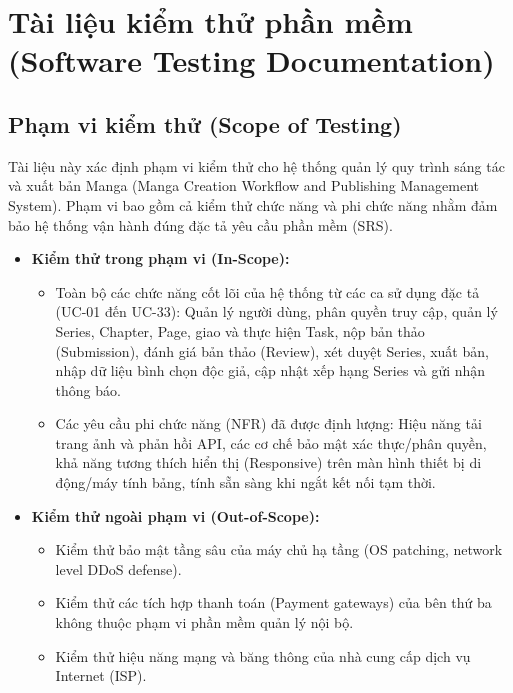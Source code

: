 \chapter{Tài liệu kiểm thử phần mềm (Software Testing Documentation)}
\label{ch:kiem_thu}

\section{Phạm vi kiểm thử (Scope of Testing)}
\label{sec:test_scope}

Tài liệu này xác định phạm vi kiểm thử cho hệ thống quản lý quy trình sáng tác và xuất bản Manga (Manga Creation Workflow and Publishing Management System). Phạm vi bao gồm cả kiểm thử chức năng và phi chức năng nhằm đảm bảo hệ thống vận hành đúng đặc tả yêu cầu phần mềm (SRS).

\begin{itemize}
    \item \textbf{Kiểm thử trong phạm vi (In-Scope):}
    \begin{itemize}
        \item Toàn bộ các chức năng cốt lõi của hệ thống từ các ca sử dụng đặc tả (UC-01 đến UC-33): Quản lý người dùng, phân quyền truy cập, quản lý Series, Chapter, Page, giao và thực hiện Task, nộp bản thảo (Submission), đánh giá bản thảo (Review), xét duyệt Series, xuất bản, nhập dữ liệu bình chọn độc giả, cập nhật xếp hạng Series và gửi nhận thông báo.
        \item Các yêu cầu phi chức năng (NFR) đã được định lượng: Hiệu năng tải trang ảnh và phản hồi API, các cơ chế bảo mật xác thực/phân quyền, khả năng tương thích hiển thị (Responsive) trên màn hình thiết bị di động/máy tính bảng, tính sẵn sàng khi ngắt kết nối tạm thời.
    \end{itemize}
    \item \textbf{Kiểm thử ngoài phạm vi (Out-of-Scope):}
    \begin{itemize}
        \item Kiểm thử bảo mật tầng sâu của máy chủ hạ tầng (OS patching, network level DDoS defense).
        \item Kiểm thử các tích hợp thanh toán (Payment gateways) của bên thứ ba không thuộc phạm vi phần mềm quản lý nội bộ.
        \item Kiểm thử hiệu năng mạng và băng thông của nhà cung cấp dịch vụ Internet (ISP).
    \end{itemize}
\end{itemize}


